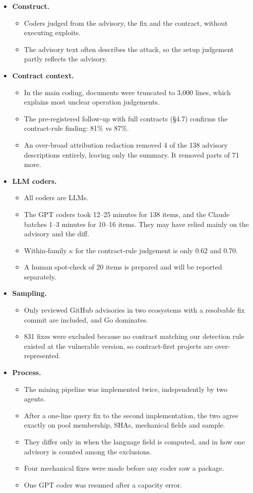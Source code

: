\documentclass[conference]{IEEEtran}
\begin{document}
\begin{itemize}
\item \textbf{Construct.}
\begin{itemize}
\item Coders judged from the advisory, the fix and the contract, without executing exploits.
\item The advisory text often describes the attack, so the setup judgement partly reflects the advisory.
\end{itemize}
\item \textbf{Contract context.}
\begin{itemize}
\item In the main coding, documents were truncated to 3,000 lines, which explains most unclear operation judgements.
\item The pre-registered follow-up with full contracts (\S{}4.7) confirms the contract-rule finding: 81\% vs 87\%.
\item An over-broad attribution redaction removed 4 of the 138 advisory descriptions entirely, leaving only the summary. It removed parts of 71 more.
\end{itemize}
\item \textbf{LLM coders.}
\begin{itemize}
\item All coders are LLMs.
\item The GPT coders took 12--25 minutes for 138 items, and the Claude batches 1--3 minutes for 10--16 items. They may have relied mainly on the advisory and the diff.
\item Within-family $\kappa$ for the contract-rule judgement is only 0.62 and 0.70.
\item A human spot-check of 20 items is prepared and will be reported separately.
\end{itemize}
\item \textbf{Sampling.}
\begin{itemize}
\item Only reviewed GitHub advisories in two ecosystems with a resolvable fix commit are included, and Go dominates.
\item 831 fixes were excluded because no contract matching our detection rule existed at the vulnerable version, so contract-first projects are over-represented.
\end{itemize}
\item \textbf{Process.}
\begin{itemize}
\item The mining pipeline was implemented twice, independently by two agents.
\item After a one-line query fix to the second implementation, the two agree exactly on pool membership, SHAs, mechanical fields and sample.
\item They differ only in when the language field is computed, and in how one advisory is counted among the exclusions.
\item Four mechanical fixes were made before any coder saw a package.
\item One GPT coder was resumed after a capacity error.
\end{itemize}
\end{itemize}
\end{document}
